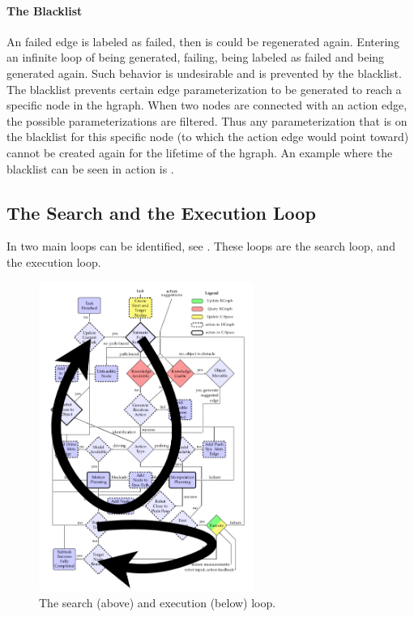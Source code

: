 \paragraph{The Blacklist}%
An failed edge is labeled as failed, then is could be regenerated again. Entering an infinite loop of being generated, failing, being labeled as failed and being generated again. Such behavior is undesirable and is prevented by the blacklist. The blacklist prevents certain edge parameterization to be generated to reach a specific node in the \ac{hgraph}. When two nodes are connected with an action edge, the possible parameterizations are filtered. Thus any parameterization that is on the blacklist for this specific node (to which the action edge would point toward) cannot be created again for the lifetime of the \ac{hgraph}. An example where the blacklist can be seen in action is .\bs

\subsection{The Search and the Execution Loop}%
\label{subsec:two_loops}
In  two main loops can be identified, see . These loops are the search loop, and the execution loop.\bs

\begin{figure}[H]
    \centering
    \includegraphics[width=7cm]{figures/two_loops_identified}
    \caption{The search (above) and execution (below) loop.}%
    \label{fig:two_loops_identified}
\end{figure}

